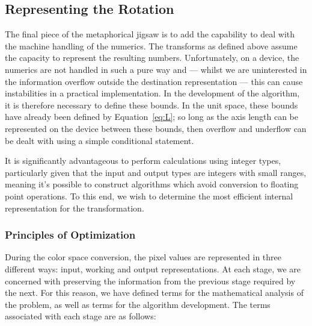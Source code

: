 \subsection{Representing the Rotation}



The final piece of the metaphorical jigsaw is to add the capability to deal with the machine handling of the numerics. The transforms as defined above assume the capacity to represent the resulting numbers. Unfortunately, on a device, the numerics are not handled in such a pure way and --- whilst we are uninterested in the information overflow outside the destination representation --- this can cause instabilities in a practical implementation. In the development of the algorithm, it is therefore necessary to define these bounds. In the unit space, these bounds have already been defined by Equation~\ref{eq:L}; so long as the axis length can be represented on the device between these bounds, then overflow and underflow can be dealt with using a simple conditional statement.



It is significantly advantageous to perform calculations using integer types, particularly given that the input and output types are integers with small ranges, meaning it's possible to construct algorithms which avoid conversion to floating point operations. To this end, we wish to determine the most efficient internal representation for the transformation.



\subsubsection{Principles of Optimization}



During the color space conversion, the pixel values are represented in three different ways: input, working and output representations. At each stage, we are concerned with preserving the information from the previous stage required by the next. For this reason, we have defined terms for the mathematical analysis of the problem, as well as terms for the algorithm development. The terms associated with each stage are as follows:



